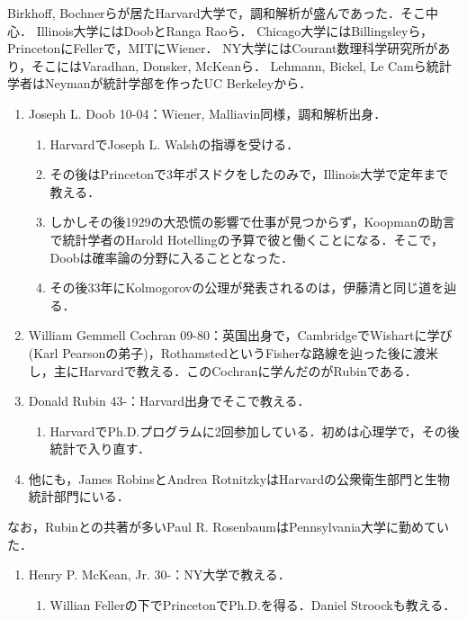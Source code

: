 \documentclass[uplatex,dvipdfmx]{jsreport}
\begin{document}
\begin{history}[U.S.学派]
    Birkhoff, Bochnerらが居たHarvard大学で，調和解析が盛んであった．そこ中心．
    Illinois大学にはDoobとRanga Raoら．
    Chicago大学にはBillingsleyら，PrincetonにFellerで，MITにWiener．
    NY大学にはCourant数理科学研究所があり，そこにはVaradhan, Donsker, McKeanら．
    Lehmann, Bickel, Le Camら統計学者はNeymanが統計学部を作ったUC Berkeleyから．
    \begin{enumerate}[({H}1)]
        \item Joseph L. Doob 10-04：Wiener, Malliavin同様，調和解析出身．
        \begin{enumerate}
            \item HarvardでJoseph L. Walshの指導を受ける．
            \item その後はPrincetonで3年ポスドクをしたのみで，Illinois大学で定年まで教える．
            \item しかしその後1929の大恐慌の影響で仕事が見つからず，Koopmanの助言で統計学者のHarold Hotellingの予算で彼と働くことになる．そこで，Doobは確率論の分野に入ることとなった．
            \item その後33年にKolmogorovの公理が発表されるのは，伊藤清と同じ道を辿る．
        \end{enumerate}
        \item William Gemmell Cochran 09-80：英国出身で，CambridgeでWishartに学び(Karl Pearsonの弟子)，RothamstedというFisherな路線を辿った後に渡米し，主にHarvardで教える．このCochranに学んだのがRubinである．
        \item Donald Rubin 43-：Harvard出身でそこで教える．
        \begin{enumerate}
            \item HarvardでPh.D.プログラムに2回参加している．初めは心理学で，その後統計で入り直す．
        \end{enumerate}
        \item 他にも，James RobinsとAndrea RotnitzkyはHarvardの公衆衛生部門と生物統計部門にいる．
    \end{enumerate}
    なお，Rubinとの共著が多いPaul R. RosenbaumはPennsylvania大学に勤めていた．
    \begin{enumerate}[({NY}1)]
        \item Henry P. McKean, Jr. 30-：NY大学で教える．
        \begin{enumerate}
            \item Willian Fellerの下でPrincetonでPh.D.を得る．Daniel Stroockも教える．
        \end{enumerate}

\end{enumerate}
\end{history}
\end{document}
